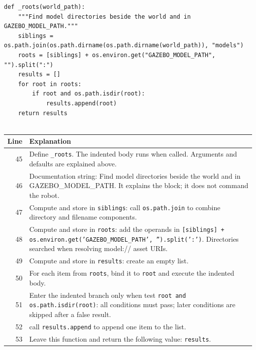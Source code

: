 \documentclass[11pt,a4paper]{book}
\begin{document}
\begin{lstlisting}[firstnumber=45]
def _roots(world_path):
    """Find model directories beside the world and in GAZEBO_MODEL_PATH."""
    siblings = os.path.join(os.path.dirname(os.path.dirname(world_path)), "models")
    roots = [siblings] + os.environ.get("GAZEBO_MODEL_PATH", "").split(":")
    results = []
    for root in roots:
        if root and os.path.isdir(root):
            results.append(root)
    return results


\end{lstlisting}

\begin{longtable}{r p{}}

\textbf{Line} & \textbf{Explanation} \\ \hline \endhead

45 & Define \texttt{\_roots}. The indented body runs when called. Arguments and defaults are explained above. \\

46 & Documentation string: Find model directories beside the world and in GAZEBO\_MODEL\_PATH. It explains the block; it does not command the robot. \\

47 & Compute and store in \texttt{siblings}: call \texttt{os.path.join} to combine directory and filename components.  \\

48 & Compute and store in \texttt{roots}: add the operands in \texttt{[siblings] + os.environ.get('GAZEBO\_MODEL\_PATH', '').split(':')}. Directories searched when resolving model:// asset URIs. \\

49 & Compute and store in \texttt{results}: create an empty list.  \\

50 & For each item from \texttt{roots}, bind it to \texttt{root} and execute the indented body. \\

51 & Enter the indented branch only when test \texttt{root and os.path.isdir(root)}: all conditions must pass; later conditions are skipped after a false result. \\

52 & call \texttt{results.append} to append one item to the list. \\

53 & Leave this function and return the following value: \texttt{results}. \\

\end{longtable}
\end{document}

